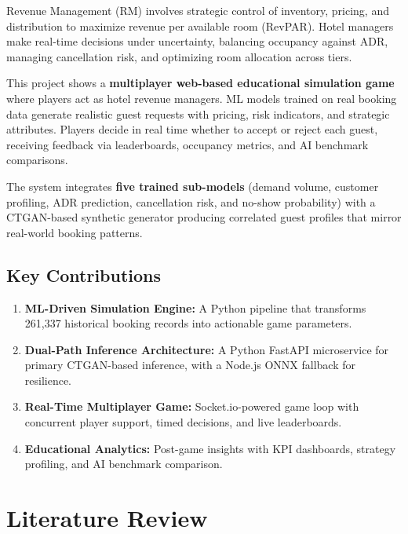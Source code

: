 \documentclass[12pt,a4paper,openany]{report}
\begin{document}
Revenue Management (RM) involves strategic control of inventory, pricing, and distribution to maximize revenue per available room (RevPAR). Hotel managers make real-time decisions under uncertainty, balancing occupancy against ADR, managing cancellation risk, and optimizing room allocation across tiers.

This project shows a \textbf{multiplayer web-based educational simulation game} where players act as hotel revenue managers. ML models trained on real booking data generate realistic guest requests with pricing, risk indicators, and strategic attributes. Players decide in real time whether to accept or reject each guest, receiving feedback via leaderboards, occupancy metrics, and AI benchmark comparisons.

The system integrates \textbf{five trained sub-models} (demand volume, customer profiling, ADR prediction, cancellation risk, and no-show probability) with a CTGAN-based synthetic generator producing correlated guest profiles that mirror real-world booking patterns.

\vspace{-10pt}

\section{Key Contributions}

\begin{enumerate}
  \item \textbf{ML-Driven Simulation Engine:} A Python pipeline that transforms 261,337 historical booking records into actionable game parameters.
  \item \textbf{Dual-Path Inference Architecture:} A Python FastAPI microservice for primary CTGAN-based inference, with a Node.js ONNX fallback for resilience.
  \item \textbf{Real-Time Multiplayer Game:} Socket.io-powered game loop with concurrent player support, timed decisions, and live leaderboards.
  \item \textbf{Educational Analytics:} Post-game insights with KPI dashboards, strategy profiling, and AI benchmark comparison.
\end{enumerate}

\chapter{Literature Review}
\label{ch:litreview}
\end{document}
